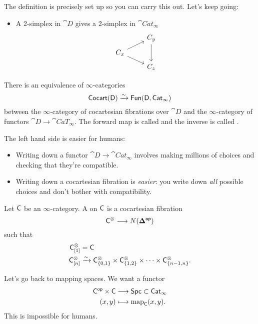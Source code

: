 The definition is precisely set up so you can carry this out. Let's keep going:
\begin{itemize}
	\item A 2-simplex in $\cat{D}$ gives a 2-simplex in $\cat{Cat}_\infty$ 
		\[
		\begin{tikzcd}[row sep=tiny]
			& C_y \ar[dd] \\
			C_x \ar[ur] \ar[dr] \\
			& C_z
		\end{tikzcd}
		\] 
\end{itemize}
\begin{theorem}
	There is an equivalence of $\infty$-categories
	\[
		\mathsf{Cocart}(\mathsf{D}) \xrightarrow{\sim} \mathsf{Fun}(\mathsf{D},\mathsf{Cat}_\infty)
	\] 
	between the $\infty$-category of cocartesian fibrations over $\cat{D}$ and the $\infty$-category of functors $\cat{D}\to \cat{CaT}_\infty$. The forward map is called  and the inverse is called .
\end{theorem}
The left hand side is easier for humans:
\begin{itemize}
	\item Writing down a functor $\cat{D}\to \cat{Cat}_\infty$ involves making millions of choices and checking that they're compatible.
	\item Writing down a cocartesian fibration is \emph{easier}: you write down \emph{all} possible choices and don't bother with compatibility.
\end{itemize}
\begin{definition}
	Let $\mathsf{C}$ be an $\infty$-category. A  on $\mathsf{C}$ is a cocartesian fibration
	\[
		\C^{\otimes} \to N(\bb{\Delta}\op)
	\] 
	such that
	\begin{align*}
		\mathsf{C}_{[1]}^{\otimes} &= \mathsf{C} \\
		\mathsf{C}_{[n]}^{\otimes} &\xrightarrow{\sim} \mathsf{C}_{\{0,1\} }^{\otimes}\times \mathsf{C}_{\{1,2\} }^{\otimes}\times \dots\times \mathsf{C}_{\{n-1,n\} }^{\otimes}.
	\end{align*}
\end{definition}

Let's go back to mapping spaces. We want a functor
\begin{align*}
	\mathsf{C}^\mathsf{op}\times \mathsf{C} &\longrightarrow \mathsf{Spc} \subset \mathsf{Cat}_\infty \\
	(x,y) &\longmapsto \operatorname{map}_\mathsf{C}(x,y).
\end{align*}
This is impossible for humans.


